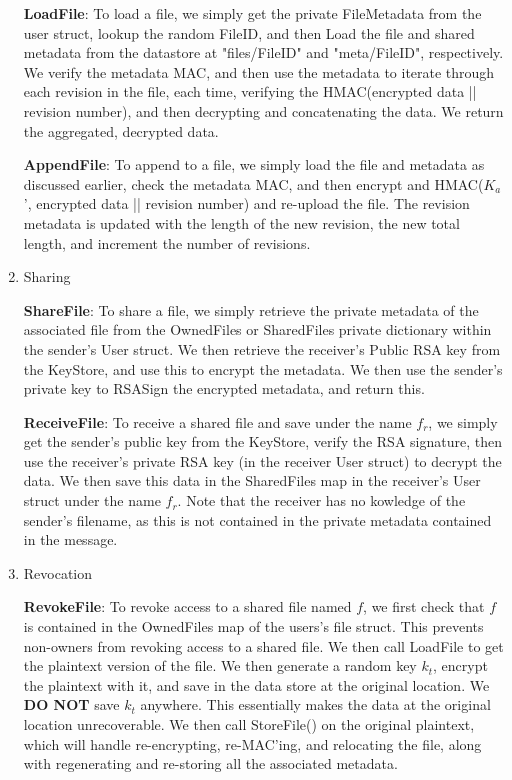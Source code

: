 \documentclass[11pt]{article}
\begin{document}
\begin{enumerate}
\textbf{LoadFile}: To load a file, we simply get the private FileMetadata from the user struct, lookup the random FileID, and then Load the file and shared metadata from the datastore at "files/FileID" and "meta/FileID", respectively. We verify the metadata MAC, and then use the metadata to iterate through each revision in the file, each time, verifying the HMAC(encrypted data || revision number), and then decrypting and concatenating the data. We return the aggregated, decrypted data.

\textbf{AppendFile}: To append to a file, we simply load the file and metadata as discussed earlier, check the metadata MAC, and then encrypt and HMAC($K_a$', encrypted data || revision number) and re-upload the file. The revision metadata is updated with the length of the new revision, the new total length, and increment the number of revisions.

\item{Sharing}

\textbf{ShareFile}: To share  a file, we simply retrieve the private metadata of the associated file from the OwnedFiles or SharedFiles private dictionary within the sender's User struct. We then retrieve the receiver's Public RSA key from the KeyStore, and use this to encrypt the metadata. We then use the sender's private key to RSASign the encrypted metadata, and return this.

\textbf{ReceiveFile}: To receive a shared file and save under the name $f_r$, we simply get the sender's public key from the KeyStore, verify the RSA signature, then use the receiver's private RSA key (in the receiver User struct) to decrypt the data. We then save this data in the SharedFiles map in the receiver's User struct under the name $f_r$. Note that the receiver has no kowledge of the sender's filename, as this is not contained in the private metadata contained in the message.

\item{Revocation}

\textbf{RevokeFile}: To revoke access to a shared file named $f$, we first check that $f$ is contained in the OwnedFiles map of the users's file struct. This prevents non-owners from revoking access to a shared file. We then call LoadFile to get the plaintext version of the file. We then generate a random key $k_t$, encrypt the plaintext with it, and save in the data store at the original location. We \textbf{DO NOT} save $k_t$ anywhere. This essentially makes the data at the original location unrecoverable. We then call StoreFile() on the original plaintext, which will handle re-encrypting, re-MAC'ing, and relocating the file, along with regenerating and re-storing all the associated metadata.

\end{enumerate}
\end{document}

